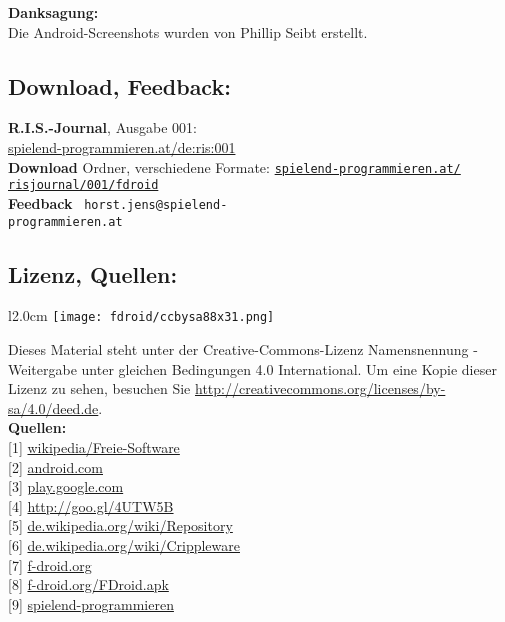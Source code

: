 \textbf{Danksagung:} \\
Die Android-Screenshots wurden von Phillip Seibt erstellt.

\subsection*{Download, Feedback:}
\textbf{R.I.S.-Journal}, Ausgabe 001: \\
\href{http://spielend-programmieren.at/de:ris:001}{spielend-programmieren.at/de:ris:001}\\
\textbf{Download} Ordner, verschiedene Formate: \href{http://spielend-programmieren.at/risjournal/001/fdroid}{\texttt{spielend-programmieren.at/\\risjournal/001/fdroid}} \\
\textbf{Feedback} \Letter\ \texttt{horst.jens@spielend-\\programmieren.at} \\



\subsection*{Lizenz, Quellen:}
\begin{wrapfigure}{l}{2.0cm}
\texttt{[image: fdroid/ccbysa88x31.png]}
\end{wrapfigure}
Dieses Material steht unter der Creative-Commons-Lizenz Namensnennung - Weitergabe unter gleichen Bedingungen 4.0 International. Um eine Kopie dieser Lizenz zu sehen, besuchen Sie \url{http://creativecommons.org/licenses/by-sa/4.0/deed.de}. \\

\textbf{Quellen:} \\
{[}1{]} \href{http://de.wikipedia.org/wiki/Freie_Software}{wikipedia/Freie-Software} \\
{[}2{]} \href{http://www.android.com}{android.com} \\
{[}3{]} \href{https://play.google.com/store}{play.google.com} \\
{[}4{]} \href{http://de.wikipedia.org/wiki/GNU_General_Public_License}{http://goo.gl/4UTW5B} \\
{[}5{]} \href{http://de.wikipedia.org/wiki/Repository}{de.wikipedia.org/wiki/Repository} \\
{[}6{]} \href{http://de.wikipedia.org/wiki/Crippleware}{de.wikipedia.org/wiki/Crippleware} \\
{[}7{]} \href{http://f-droid.org/}{f-droid.org} \\
{[}8{]} \href{http://f-droid.org/FDroid.apk}{f-droid.org/FDroid.apk} \\
{[}9{]} \href{http://spielend-programmieren.at}{spielend-programmieren} 
